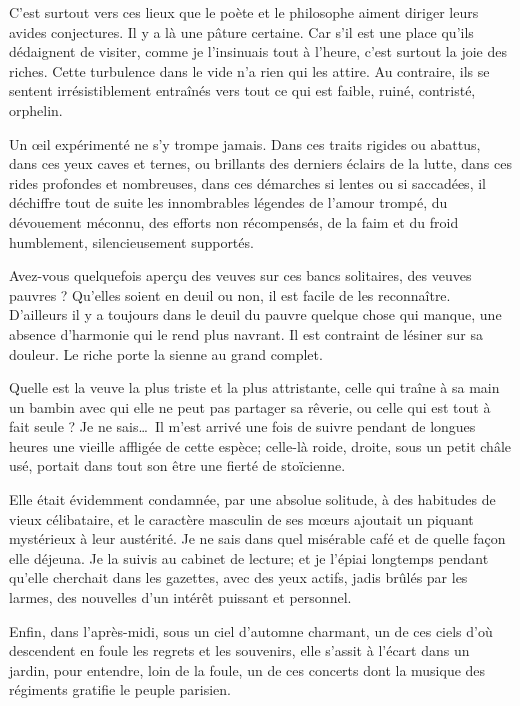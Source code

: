 C’est surtout vers ces lieux que le poète et le
philosophe aiment diriger leurs avides conjectures. Il y a là une
pâture certaine. Car s’il est une place
qu’ils dédaignent de visiter, comme je
l’insinuais tout à l’heure,
c’est surtout la joie des riches. Cette turbulence
dans le vide n’a rien qui les attire. Au contraire,
ils se sentent irrésistiblement entraînés vers tout ce qui est faible,
ruiné, contristé, orphelin.

Un \oe il expérimenté ne s’y trompe jamais. Dans ces
traits rigides ou abattus, dans ces yeux caves et ternes, ou brillants
des derniers éclairs de la lutte, dans ces rides profondes et
nombreuses, dans ces démarches si lentes ou si saccadées, il déchiffre
tout de suite les innombrables légendes de l’amour
trompé, du dévouement méconnu, des efforts non récompensés, de la faim
et du froid humblement, silencieusement supportés.

Avez{}-vous quelquefois aperçu des veuves sur ces bancs solitaires, des
veuves pauvres ? Qu’elles soient en deuil ou non, il
est facile de les reconnaître. D’ailleurs il y a
toujours dans le deuil du pauvre quelque chose qui manque, une absence
d’harmonie qui le rend plus navrant. Il est contraint
de lésiner sur sa douleur. Le riche porte la sienne au grand complet.

Quelle est la veuve la plus triste et la plus attristante, celle qui
traîne à sa main un bambin avec qui elle ne peut pas partager sa
rêverie, ou celle qui est tout à fait seule ? Je ne sais\ldots\ Il
m’est arrivé une fois de suivre pendant de longues
heures une vieille affligée de cette espèce; celle{}-là roide, droite,
sous un petit châle usé, portait dans tout son être une fierté de
stoïcienne.

Elle était évidemment condamnée, par une absolue solitude, à des
habitudes de vieux célibataire, et le caractère masculin de ses m\oe urs
ajoutait un piquant mystérieux à leur austérité. Je ne sais dans quel
misérable café et de quelle façon elle déjeuna. Je la suivis au cabinet
de lecture; et je l’épiai longtemps pendant
qu’elle cherchait dans les gazettes, avec des yeux
actifs, jadis brûlés par les larmes, des nouvelles
d’un intérêt puissant et personnel.

Enfin, dans l’après{}-midi, sous un ciel
d’automne charmant, un de ces ciels
d’où descendent en foule les regrets et les souvenirs,
elle s’assit à l’écart dans un
jardin, pour entendre, loin de la foule, un de ces concerts dont la
musique des régiments gratifie le peuple parisien.


